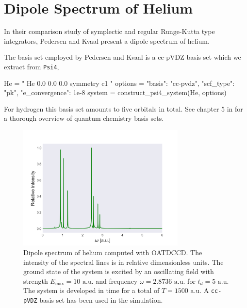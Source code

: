 \section{Dipole Spectrum of Helium}

In their comparison study of symplectic and regular Runge-Kutta type integrators, 
Pedersen and Kvaal \cite{pedersen2019symplectic} present a dipole 
spectrum of helium. 

The basis set employed by Pedersen and Kvaal is a cc-pVDZ 
basis set which we extract from \lstinline{Psi4},
\begin{python}
He = "
    He 0.0 0.0 0.0
    symmetry c1
"
options = {"basis": "cc-pvdz", "scf_type": "pk", "e_convergence": 1e-8}
system = construct_psi4_system(He, options)
\end{python}
For hydrogen this basis set amounts to five orbitals in total. See chapter 5 in
\citeauthor{jensen2017introduction} \cite{jensen2017introduction}for a thorough
overview of quantum chemistry basis sets.

\begin{figure}
    \centering
    \includegraphics[width=0.75\textwidth]{results/figures/helium_spectrum.png} 
    \caption{Dipole spectrum of helium computed with OATDCCD. The intensity of the 
        spectral lines is in relative dimensionless units.
        The ground state of the system is excited by 
        an oscillating field with strength $E_\text{max} = 10\text{ a.u.}$ and 
        frequency $\omega = 2.8736 \text{ a.u.}$ for $t_d = 5 \text{ a.u.}$ The
        system is developed in time for a total of $T = 1500 \text{ a.u.}$
        A \lstinline{cc-pVDZ} basis set has been used in the simulation. 
    }
    \label{fig:helium_spectrum}
\end{figure}

